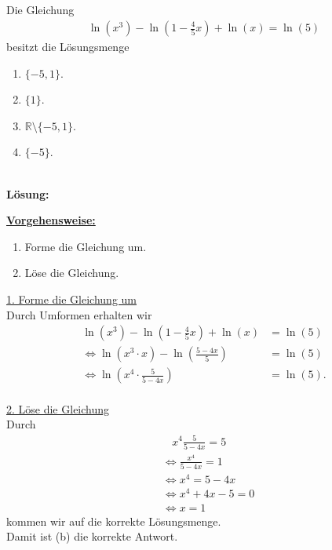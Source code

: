 \newpage

\subsection*{}
Die Gleichung
\begin{align*}
\ln(x^3) - \ln \left( 1 - \frac{4}{5}x \right) + \ln(x) = \ln(5)
\end{align*}
besitzt die Lösungsmenge
\renewcommand{\labelenumi}{(\alph{enumi})}
\begin{enumerate}
\item $\lbrace -5,1 \rbrace$.
\item $\lbrace 1 \rbrace$.
\item $\mathbb{R} \setminus \lbrace -5, 1 \rbrace$.
\item $\lbrace -5 \rbrace$.
\end{enumerate}
\ \\
\textbf{Lösung:}
\begin{mdframed}
\underline{\textbf{Vorgehensweise:}}
\renewcommand{\labelenumi}{\theenumi.}
\begin{enumerate}
\item Forme die Gleichung um.
\item Löse die Gleichung. 
\end{enumerate}
\end{mdframed}


\underline{1. Forme die Gleichung um}\\
Durch Umformen erhalten wir
\begin{align*}
\ln(x^3) - \ln \left( 1 - \frac{4}{5}x \right) + \ln(x) &= \ln(5)\\
\Leftrightarrow
\ln(x^3 \cdot x) - \ln \left( \frac{5 - 4 x}{5} \right) &= \ln(5)\\
\Leftrightarrow
\ln \left(x^4 \cdot \frac{5}{5-4x}\right) &= \ln(5). 
\end{align*}
\\
\underline{2. Löse die Gleichung}\\
Durch 
\begin{align*}
&\ \ \  \ x^4 \frac{5}{5-4x} = 5\\
&\Leftrightarrow 
 \frac{x^4}{5-4x} = 1\\
&\Leftrightarrow  
x^4 = 5 - 4x\\
&\Leftrightarrow 
x^4 + 4x - 5 = 0\\
&\Leftrightarrow 
x =1
\end{align*}
kommen wir auf die korrekte Lösungsmenge.\\
Damit ist (b) die korrekte Antwort.

